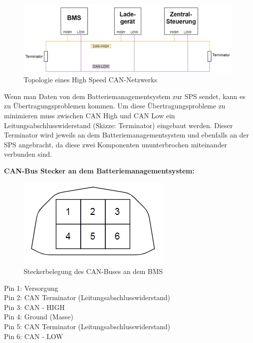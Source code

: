 \begin{figure}[H]
	\begin{center}
		\includegraphics[scale=0.7]{figures/Akku/TopologieCAN-Netzwerks.PNG}
		\caption{Topologie eines High Speed CAN-Netzwerks}
	\end{center}
\end{figure}

Wenn man Daten von dem Batteriemanagementsystem zur SPS sendet, kann es zu Übertragungsproblemen kommen. Um diese Übertragungsprobleme zu minimieren muss zwischen CAN High und CAN Low ein Leitungsabschlusswiderstand (Skizze: Terminator) eingebaut werden. Dieser Terminator wird jeweils an dem Batteriemanagementsystem und ebenfalls an der SPS angebracht, da diese zwei Komponenten ununterbrochen miteinander verbunden sind. 

\textbf{CAN-Bus Stecker an dem Batteriemanagementsystem:}

\begin{figure}[H]
	\begin{center}
		\includegraphics[scale=0.7]{figures/Akku/CANStecker.PNG}
		\caption{Steckerbelegung des CAN-Buses an dem BMS}
	\end{center}
\end{figure}

Pin 1: Versorgung\\
Pin 2: CAN Terminator (Leitungsabschlusswiderstand)\\
Pin 3: CAN - HIGH\\
Pin 4: Ground (Masse)\\
Pin 5: CAN Terminator (Leitungsabschlusswiderstand)\\
Pin 6: CAN - LOW\\
\newpage

